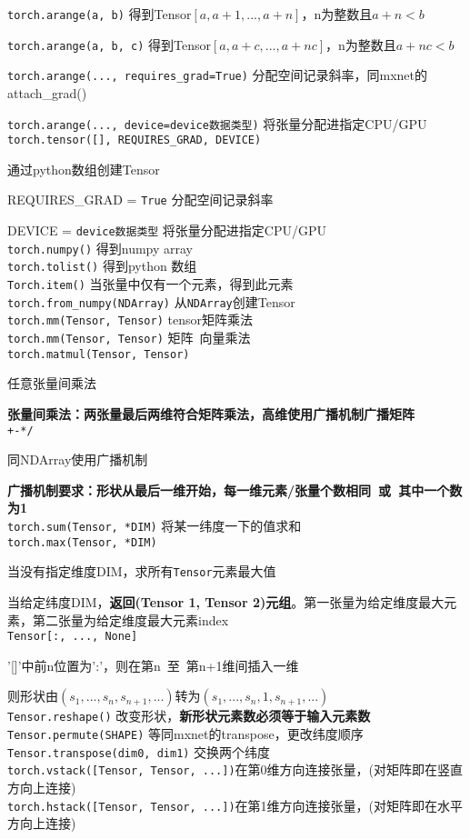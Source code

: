 \documentclass[UTF8]{ctexart}
\begin{document}
  \texttt{torch.arange(a, b)} 得到Tensor$[a, a+1, ..., a+n]$，n为整数且$a+n < b$

  \texttt{torch.arange(a, b, c)} 得到Tensor$[a, a+c, ..., a+nc]$，n为整数且$a+nc < b$
  
  \texttt{torch.arange(..., requires\_grad=True)} 分配空间记录斜率，同mxnet的attach\_grad()
  
  \texttt{torch.arange(..., device=device数据类型)} 将张量分配进指定CPU/GPU\\
\texttt{torch.tensor([], REQUIRES\_GRAD, DEVICE)}
  
  通过python数组创建Tensor

  REQUIRES\_GRAD = \texttt{True} 分配空间记录斜率
  
  DEVICE = \texttt{device数据类型} 将张量分配进指定CPU/GPU\\
\texttt{torch.numpy()} 得到numpy array \\
\texttt{torch.tolist()} 得到python 数组 \\
\texttt{Torch.item()} 当张量中仅有一个元素，得到此元素 \\
\texttt{torch.from\_numpy(NDArray)} 从\texttt{NDArray}创建Tensor\\
\texttt{torch.mm(Tensor, Tensor)} tensor矩阵乘法\\
\texttt{torch.mm(Tensor, Tensor)} 矩阵\ 向量乘法\\
\texttt{torch.matmul(Tensor, Tensor)} 

  任意张量间乘法
  
  \textbf{张量间乘法：两张量最后两维符合矩阵乘法，高维使用广播机制广播矩阵}\\
\texttt{+-*/} 

  同NDArray使用广播机制
  
  \textbf{广播机制要求：形状从最后一维开始，每一维元素/张量个数相同\ 或\ 其中一个数为1}\\
\texttt{torch.sum(Tensor, *DIM)} 将某一纬度一下的值求和\\
\texttt{torch.max(Tensor, *DIM)} 

  当没有指定维度DIM，求所有\texttt{Tensor}元素最大值
  
  当给定纬度DIM，\textbf{返回(Tensor 1, Tensor 2)元组}。第一张量为给定维度最大元素，第二张量为给定维度最大元素index\\
\texttt{Tensor[:, ..., None]} 
  
  '[]'中前n位置为':'，则在第n\ 至\ 第n+1维间插入一维

  则形状由$(s_1, ..., s_n, s_{n+1}, ...)$转为$(s_1, ..., s_n, 1, s_{n+1}, ...)$\\
\texttt{Tensor.reshape()} 改变形状，\textbf{新形状元素数必须等于输入元素数}\\
\texttt{Tensor.permute(SHAPE)} 等同mxnet的transpose，更改纬度顺序\\
\texttt{Tensor.transpose(dim0, dim1)} 交换两个纬度\\
\texttt{torch.vstack([Tensor, Tensor, ...])}在第0维方向连接张量，(对矩阵即在竖直方向上连接)\\
\texttt{torch.hstack([Tensor, Tensor, ...])}在第1维方向连接张量，(对矩阵即在水平方向上连接)
\end{document}
